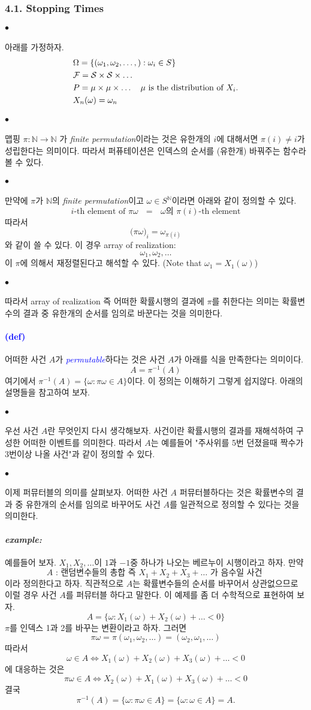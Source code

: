 \documentclass[12pt,oneside,english]{book}
\def\ck{\paragraph{\Large$\bullet$}\Large}
\def\ex{\paragraph{\Large\textit{example:}}\Large}
\newcommand{\parablue}[1]{\paragraph{\Large\textcolor{blue}{(#1)}}\Large}
\begin{document}
\subsubsection{4.1. Stopping Times}
\ck 아래를 가정하자. 
\begin{align*}
& \Omega=\{(\omega_1,\omega_2,\dots,):\omega_i \in S \} \\ 
& {\cal F}= {\cal S} \times {\cal S} \times \dots \\ 
& P=\mu \times \mu \times  \dots  \quad \mbox{$\mu$ is the distribution of $X_i$.} \\ 
& X_n(\omega)=\omega_n
\end{align*}

\ck 맵핑 $\pi:\mathbb{N} \to \mathbb{N}$ 가 \emph{finite permutation}이라는 것은 유한개의 $i$에 대해서면 $\pi(i)\neq i$가 성립한다는 의미이다. 따라서 퍼퓨테이션은 인덱스의 순서를 (유한개) 바꿔주는 함수라 볼 수 있다. 

\ck 만약에 $\pi$가 $\mathbb{N}$의 \emph{finite permutation}이고 $\omega \in S^{\mathbb{N}}$이라면 아래와 같이 정의할 수 있다. 
\[
\mbox{$i$-th element of $\pi\omega$ $=$ $\omega$의 $\pi(i)$-th element}
\]
따라서 
\[
\big(\pi\omega\big)_i = \omega_{\pi(i)}
\]
와 같이 쓸 수 있다. 이 경우 array of realization:
\[
\omega_1,\omega_2,\dots
\]
이 $\pi$에 의해서 재정렬된다고 해석할 수 있다. (Note that $\omega_1=X_1(\omega)$)

\ck 따라서 array of realization 즉 어떠한 확률시행의 결과에 $\pi$를 취한다는 의미는 확률변수의 결과 중 유한개의 순서를 임의로 바꾼다는 것을 의미한다. 

\parablue{def} 어떠한 사건 $A$가 \emph{\textcolor{blue}{permutable}}하다는 것은 사건 $A$가 아래를 식을 만족한다는 의미이다. 
\[
A=\pi^{-1}(A)
\]
여기에서 $\pi^{-1}(A)=\{\omega:\pi\omega \in A\}$이다. 이 정의는 이해하기 그렇게 쉽지않다. 아래의 설명들을 참고하여 보자. 

\ck 우선 사건 $A$란 무엇인지 다시 생각해보자. 사건이란 확률시행의 결과를 재해석하여 구성한 어떠한 이벤트를 의미한다. 따라서 $A$는 예를들어 "주사위를 5번 던졌을때 짝수가 3번이상 나올 사건"과 같이 정의할 수 있다. 

\ck 이제 퍼뮤터블의 의미를 살펴보자. 어떠한 사건 $A$ 퍼뮤터블하다는 것은 확률변수의 결과 중 유한개의 순서를 임의로 바꾸어도 사건 $A$를 일관적으로 정의할 수 있다는 것을 의미한다. 

\ex 예를들어 보자. $X_1,X_2,\dots$이 $1$과 $-1$중 하나가 나오는 베르누이 시행이라고 하자. 만약 
\[
\mbox{$A$ : 랜덤변수들의 총합 즉 $X_1+X_2+X_3+\dots$ 가 음수일 사건 }
\]
이라 정의한다고 하자. 직관적으로 $A$는 확률변수들의 순서를 바꾸어서 상관없으므로 이럴 경우 사건 $A$를 퍼뮤터블 하다고 말한다. 
이 예제를 좀 더 수학적으로 표현하여 보자. 
\[
A=\{\omega : X_1(\omega)+X_2(\omega)+\dots<0\}
\]
$\pi$를 인덱스 1과 2를 바꾸는 변환이라고 하자. 그러면 
\[
\pi\omega=\pi(\omega_1,\omega_2,\dots)=(\omega_2,\omega_1,\dots)
\]
따라서 
\[
\omega \in A \Longleftrightarrow X_1(\omega)+X_2(\omega)+X_3(\omega)+\dots<0
\]
에 대응하는 것은 
\[
\pi\omega \in A \Longleftrightarrow X_2(\omega)+X_1(\omega)+X_3(\omega)+\dots<0
\]
결국 
\[
\pi^{-1}(A)=\{\omega : \pi \omega \in A\}=\{\omega : \omega \in A\}=A.
\]
\end{document}
